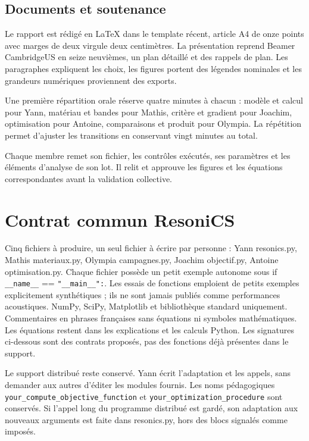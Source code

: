 \documentclass[11pt,a4paper]{article}
\begin{document}
\subsection{Documents et soutenance}

Le rapport est rédigé en LaTeX dans le template récent, article A4 de onze points avec marges de deux virgule deux centimètres. La présentation reprend Beamer CambridgeUS en seize neuvièmes, un plan détaillé et des rappels de plan. Les paragraphes expliquent les choix, les figures portent des légendes nominales et les grandeurs numériques proviennent des exports.

Une première répartition orale réserve quatre minutes à chacun : modèle et calcul pour Yann, matériau et bandes pour Mathis, critère et gradient pour Joachim, optimisation pour Antoine, comparaisons et produit pour Olympia. La répétition permet d'ajuster les transitions en conservant vingt minutes au total.

Chaque membre remet son fichier, les contrôles exécutés, ses paramètres et les éléments d'analyse de son lot. Il relit et approuve les figures et les équations correspondantes avant la validation collective.
\section{Contrat commun ResoniCS}

Cinq fichiers à produire, un seul fichier à écrire par personne : Yann {\small\ttfamily resonics.py}, Mathis {\small\ttfamily materiaux.py}, Olympia {\small\ttfamily campagnes.py}, Joachim {\small\ttfamily objectif.py}, Antoine {\small\ttfamily optimisation.py}. Chaque fichier possède un petit exemple autonome sous {\small\ttfamily if \nolinkurl{__name__} == \nolinkurl{"__main__":}}. Les essais de fonctions emploient de petits exemples explicitement synthétiques ; ils ne sont jamais publiés comme performances acoustiques. NumPy, SciPy, Matplotlib et bibliothèque standard uniquement. Commentaires en phrases françaises sans équations ni symboles mathématiques. Les équations restent dans les explications et les calculs Python. Les signatures ci-dessous sont des contrats proposés, pas des fonctions déjà présentes dans le support.

Le support distribué reste conservé. Yann écrit l'adaptation et les appels, sans demander aux autres d'éditer les modules fournis. Les noms pédagogiques {\small\ttfamily \nolinkurl{your_compute_objective_function}} et {\small\ttfamily \nolinkurl{your_optimization_procedure}} sont conservés. Si l'appel long du programme distribué est gardé, son adaptation aux nouveaux arguments est faite dans {\small\ttfamily resonics.py}, hors des blocs signalés comme imposés.
\end{document}
